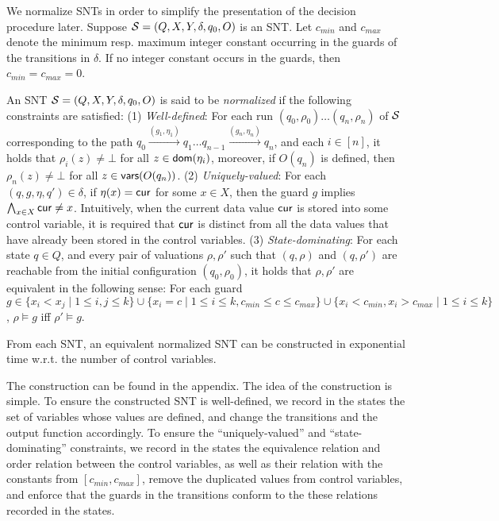 We normalize SNTs in order to simplify the presentation of the decision procedure later.
Suppose ${\mathcal{S} }=(Q,X,Y,\delta,q_0,O)$ is an SNT. Let $c_{min}$ and $c_{max}$ denote the minimum resp. maximum integer constant occurring in the guards of the transitions in $\delta$. If no integer constant occurs in the guards, then $c_{min}=c_{max}=0$.

An SNT ${\mathcal{S} }=(Q,X,Y,\delta,q_0,O)$ is said to be \emph{normalized} if the following constraints are satisfied:
(1) \emph{Well-defined}: For each run $(q_0,\rho_0) \dots (q_n,\rho_n)$ of ${\mathcal{S} }$ corresponding to the path $q_0 \xrightarrow{(g_1,\eta_1)} q_1 \dots q_{n-1} \xrightarrow{(g_n,\eta_n)} q_n$, and each $i \in [n]$, it holds that $\rho_{i}(z) \neq \bot$ for all $z \in \mathsf{dom}(\eta_i)$, 
%
moreover, if $O(q_n)$ is defined, then $\rho_n(z)\neq\bot$ for all  $z\in \mathsf{vars}(O(q_n))$. (2) \emph{Uniquely-valued}: For each $(q,g,\eta,q') \in \delta$, if $\eta(x)=\mathsf{cur}$ for some $x \in X$, then the guard $g$ implies $\bigwedge_{x \in X} \mathsf{cur} \neq x$.  Intuitively, when the current data value $\mathsf{cur}$ is stored into some control variable, it is required that $\mathsf{cur}$ is distinct from all the data values that have already been stored in the control variables. (3) \emph{State-dominating}: For each state $q \in Q$, and every pair of valuations $\rho,\rho'$ such that $(q,\rho)$ and $(q,\rho')$ are reachable from the initial configuration $(q_0,\rho_0)$, it holds that $\rho,\rho'$ are equivalent in the following sense: For each guard $g \in \{x_i < x_j \mid 1 \le i, j \le k\} \cup \{x_i = c \mid 1 \le i \le k, c_{min} \le c \le c_{max} \} \cup \{x_i < c_{min},x_i > c_{max} \mid 1 \le i \le k\}$, $\rho \models g$ iff $\rho' \models g$.

%
\begin{proposition}\label{prop-snt-norm}
	From each SNT, an equivalent normalized SNT can be constructed in  exponential time w.r.t. the number of control variables. 
\end{proposition}
%
The construction can be found in the appendix. The idea of the construction is simple. To ensure the constructed SNT is well-defined, we record in the states the set of variables whose values are defined, and change the transitions and the output function accordingly.
%
To ensure the ``uniquely-valued'' and ``state-dominating'' constraints, we record in the states the equivalence relation and order relation between the control variables, as well as their relation with the constants from $[c_{min}, c_{max}]$, remove the duplicated values from control variables, and enforce that the guards in the transitions conform to the these relations recorded in the states.

